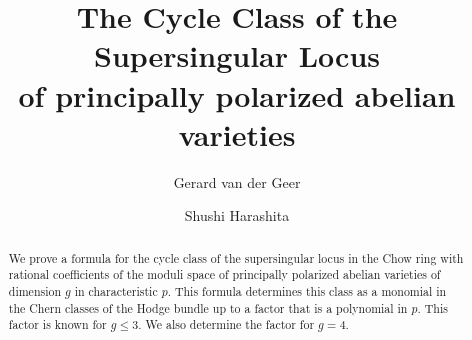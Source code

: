 \documentclass[11pt]{amsart}
\numberwithin{equation}{section}
\theoremstyle{definition}
\theoremstyle{remark}
\begin{document}
\title[]{The Cycle Class of the Supersingular Locus\\ 
of principally polarized abelian varieties}
\author{Gerard van der Geer}
\address{Korteweg-de Vries Instituut, Universiteit van
Amsterdam, Postbus 94248,
1090 GE  Amsterdam, The Netherlands.}

\author{Shushi Harashita}
\address{Graduate School of Environment and Information Sciences, Yokohama National University.}
\begin{abstract}
We prove a formula for the cycle class of the          
supersingular locus in the Chow ring with rational coefficients
of the moduli space of principally polarized abelian varieties of
dimension $g$ in characteristic $p$.
This formula determines this class as a monomial in the
Chern classes of the Hodge bundle
up to a factor that is a polynomial in $p$.
This factor is known for $g\leq 3$. We also determine the factor for $g=4$.
\end{abstract}
\end{document}
